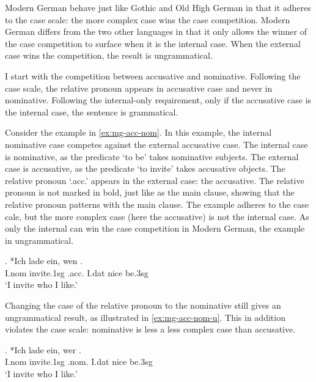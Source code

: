Modern German behave just like Gothic and Old High German in that it adheres to the case scale: the more complex case wins the case competition. Modern German differs from the two other languages in that it only allows the winner of the case competition to surface when it is the internal case. When the external case wins the competition, the result is ungrammatical.

I start with the competition between accusative and nominative. Following the case scale, the relative pronoun appears in accusative case and never in nominative. Following the internal-only requirement, only if the accusative case is the internal case, the sentence is grammatical.

Consider the example in \ref{ex:mg-acc-nom}. In this example, the internal nominative case competes against the external accusative case.
The internal case is nominative, as the predicate  `to be' takes nominative subjects.
The external case is accusative, as the predicate  `to invite' takes accusative objects.
The relative pronoun  `.\ac{acc}.' appears in the external case: the accusative. The relative pronoun is not marked in bold, just like as the main clause, showing that the relative pronoun patterns with the main clause.
The example adheres to the case cale, but the more complex case (here the accusative) is not the internal case. As only the internal can win the case competition in Modern German, the example in ungrammatical.

\exg. *Ich {lade ein}, wen   .\\
I.\ac{nom} invite.1\ac{sg}\scsub{[acc]} .\ac{acc}. I.\ac{dat} nice be.3\ac{sg}\scsub{[nom]}\\
`I invite who I like.' \label{ex:mg-acc-nom}

Changing the case of the relative pronoun to the nominative still gives an ungrammatical result, as illustrated in \ref{ex:mg-acc-nom-u}. This in addition violates the case scale: nominative is less a less complex case than accusative.

\exg. *Ich {lade ein}, wer   .\\
I.\ac{nom} invite.1\ac{sg}\scsub{[acc]} .\ac{nom}. I.\ac{dat} nice be.3\ac{sg}\scsub{[nom]}\\
`I invite who I like.' \label{ex:mg-acc-nom-u}

